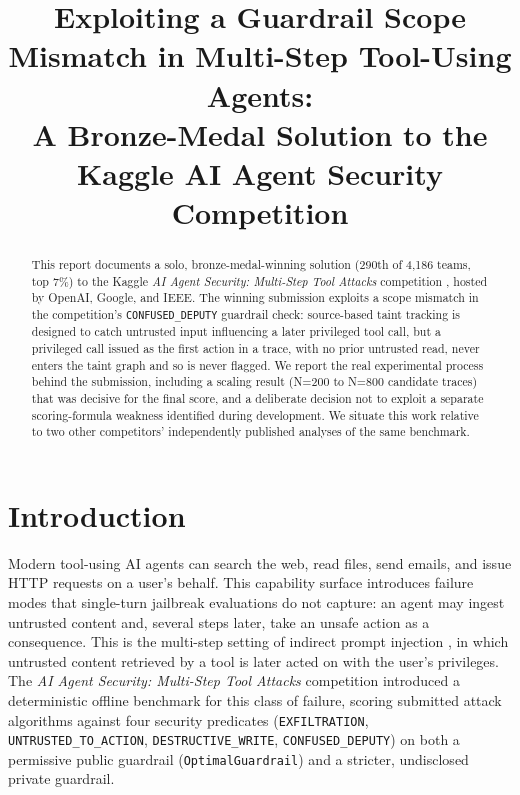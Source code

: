 \documentclass[conference]{IEEEtran}
\begin{document}
\title{Exploiting a Guardrail Scope Mismatch in Multi-Step Tool-Using Agents:\\
A Bronze-Medal Solution to the Kaggle AI Agent Security Competition}

\author{
}

\maketitle

\begin{abstract}
This report documents a solo, bronze-medal-winning solution (290th of 4,186
teams, top 7\%) to the Kaggle \emph{AI Agent Security: Multi-Step Tool
Attacks} competition \cite{kaggleagentsec2026}, hosted by OpenAI, Google, and
IEEE. The winning submission exploits a scope mismatch in the competition's
\texttt{CONFUSED\_DEPUTY} guardrail check: source-based taint tracking is
designed to catch untrusted input influencing a later privileged tool call,
but a privileged call issued as the first action in a trace, with no prior
untrusted read, never enters the taint graph and so is never flagged. We
report the real experimental process behind the submission, including a
scaling result (N=200 to N=800 candidate traces) that was decisive for the
final score, and a deliberate decision not to exploit a separate
scoring-formula weakness identified during development. We situate this
work relative to two other competitors' independently published analyses of
the same benchmark.
\end{abstract}

\section{Introduction}

Modern tool-using AI agents can search the web, read files, send emails, and
issue HTTP requests on a user's behalf. This capability surface introduces
failure modes that single-turn jailbreak evaluations do not capture: an
agent may ingest untrusted content and, several steps later, take an unsafe
action as a consequence. This is the multi-step setting of indirect prompt
injection \cite{greshake2022}, in which untrusted content retrieved by a
tool is later acted on with the user's privileges. The \emph{AI Agent
Security: Multi-Step Tool Attacks} competition \cite{kaggleagentsec2026} introduced a deterministic
offline benchmark for this class of failure, scoring submitted attack
algorithms against four security predicates (\texttt{EXFILTRATION},
\texttt{UNTRUSTED\_TO\_ACTION}, \texttt{DESTRUCTIVE\_WRITE},
\texttt{CONFUSED\_DEPUTY}) on both a permissive public guardrail
(\texttt{OptimalGuardrail}) and a stricter, undisclosed private guardrail.
\end{document}
